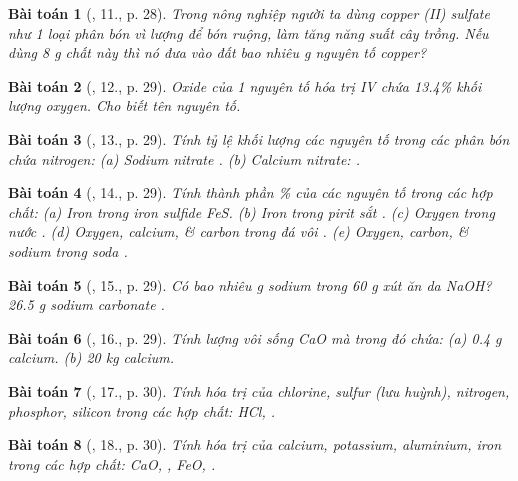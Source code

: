 \documentclass{article}
\newtheorem{baitoan}{Bài toán}
\begin{document}
\begin{baitoan}[\cite{An_Hoa_Hoc_nang_cao_8_9}, 11., p. 28]
	Trong nông nghiệp người ta dùng copper (II) sulfate như 1 loại phân bón vì lượng để bón ruộng, làm tăng năng suất cây trồng. Nếu dùng {\rm8 g} chất này thì nó đưa vào đất bao nhiêu {\rm g} nguyên tố copper?
\end{baitoan}

\begin{baitoan}[\cite{An_Hoa_Hoc_nang_cao_8_9}, 12., p. 29]
	Oxide của 1 nguyên tố hóa trị IV chứa {\rm13.4\%} khối lượng oxygen. Cho biết tên nguyên tố.
\end{baitoan}

\begin{baitoan}[\cite{An_Hoa_Hoc_nang_cao_8_9}, 13., p. 29]
	Tính tỷ lệ khối lượng các nguyên tố trong các phân bón chứa nitrogen: (a) Sodium nitrate {\rm{}}. (b) Calcium nitrate: {\rm{}}.
\end{baitoan}

\begin{baitoan}[\cite{An_Hoa_Hoc_nang_cao_8_9}, 14., p. 29]
	Tính thành phần {\rm\%} của các nguyên tố trong các hợp chất: (a) Iron trong iron sulfide {\rm FeS}. (b) Iron trong pirit sắt {\rm{}}. (c) Oxygen trong nước {\rm{}}. (d) Oxygen, calcium, \& carbon trong đá vôi {\rm{}}. (e) Oxygen, carbon, \& sodium trong soda {\rm{}}.
\end{baitoan}

\begin{baitoan}[\cite{An_Hoa_Hoc_nang_cao_8_9}, 15., p. 29]
	Có bao nhiêu {\rm g} sodium trong {\rm60 g} xút ăn da {\rm NaOH}? {\rm26.5 g} sodium carbonate {\rm{}}.
\end{baitoan}

\begin{baitoan}[\cite{An_Hoa_Hoc_nang_cao_8_9}, 16., p. 29]
	Tính lượng vôi sống {\rm CaO} mà trong đó chứa: (a) {\rm0.4 g} calcium. (b) {\rm20 kg} calcium.
\end{baitoan}

\begin{baitoan}[\cite{An_Hoa_Hoc_nang_cao_8_9}, 17., p. 30]
	Tính hóa trị của chlorine, sulfur (lưu huỳnh), nitrogen, phosphor, silicon trong các hợp chất: {\rm HCl, }.
\end{baitoan}

\begin{baitoan}[\cite{An_Hoa_Hoc_nang_cao_8_9}, 18., p. 30]
	Tính hóa trị của calcium, potassium, aluminium, iron trong các hợp chất: {\rm CaO, , FeO, }.
\end{baitoan}
\end{document}
